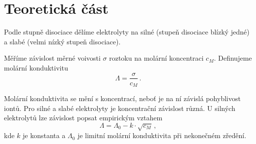 \section*{Teoretická část}
Podle stupně disociace dělíme elektrolyty na silné (stupeň disociace blízký jedné) a slabé (velmi nízký stupeň disociace).

Měříme závislost měrné voivosti $\sigma$ roztoku na molární koncentraci $c_M$.
Definujeme molární konduktivitu \cite{skripta}
\begin{equation}
\Lambda = \frac{\sigma}{c_M} \,.
\end{equation}

Molární konduktivita se mění s koncentrací, neboť je na ní závislá pohyblivost iontů.
Pro silné a slabé elektrolyty je koncentrační závislost různá.
U silných elektrolytů lze závislost popsat empirickým vztahem \cite{skripta}
\begin{equation} \label{e:silne}
\Lambda = \Lambda_0 - k \cdot \sqrt{c_M} \,,
\end{equation}
kde $k$ je konstanta a $\Lambda_0$ je limitní molární konduktivita při nekonečném zředění.